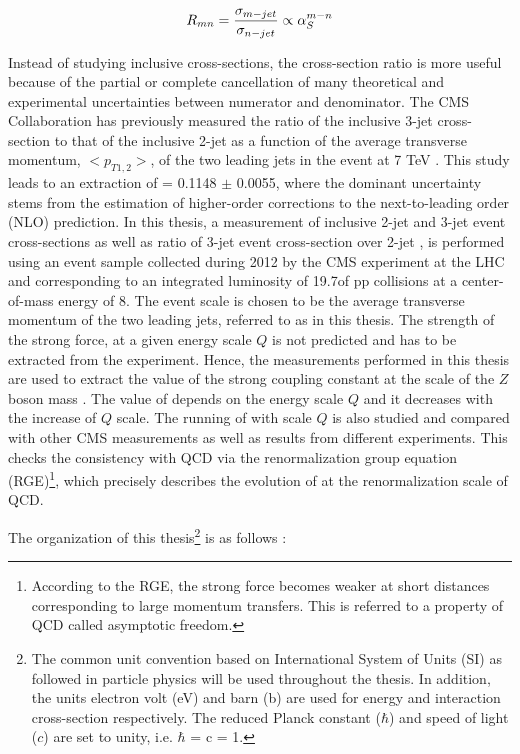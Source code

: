\begin{equation}
R_{mn} = \frac{\sigma_{m-jet}}{\sigma_{n-jet}} \propto \alps^{m-n}
\label{eq:ratio_mn}
\end{equation}

Instead of studying inclusive cross-sections, the cross-section ratio is more useful because of the partial or complete cancellation of many theoretical and experimental uncertainties between numerator and denominator. The CMS Collaboration has previously measured the ratio of the inclusive 3-jet cross-section to that of the inclusive 2-jet as a function of the average transverse momentum, $<p_{T1,2}>$, of the two leading jets in the event at 7 TeV \cite {Chatrchyan:2013txa}. This study leads to an extraction of \alpsmz = 0.1148 $\pm$ 0.0055, where the dominant uncertainty stems from the estimation of higher-order corrections to the next-to-leading order (NLO) prediction. In this thesis, a measurement of inclusive 2-jet and 3-jet event cross-sections as well as ratio of 3-jet event cross-section over 2-jet \rations, is performed using an event sample collected during 2012 by the CMS experiment at the LHC and corresponding to an integrated luminosity of 19.7\fbinv of pp collisions at a center-of-mass energy of 8\TeV. The event scale is chosen to be the average transverse momentum of the two leading jets, referred to as \httwo in this thesis. The strength of the strong force, \alps at a given energy scale $Q$ is not predicted and has to be extracted from the experiment. Hence, the measurements performed in this thesis are used to extract the value of the strong coupling constant at the scale of the $Z$ boson mass \alpsmz. The value of \alps depends on the energy scale $Q$ and it decreases with the increase of $Q$ scale. The running of \alps with scale $Q$ is also studied and compared with other CMS measurements as well as results from different experiments. This checks the consistency with QCD via the renormalization group equation (RGE)\footnote{According to the RGE, the strong force becomes weaker at short distances corresponding to large momentum transfers. This is referred to a property of QCD called asymptotic freedom.}, which precisely describes the evolution of \alps at the renormalization scale of QCD. 

The organization of this thesis\footnote{The common unit convention based on International System of Units (SI) as followed in particle physics will be used throughout the thesis. In addition, the units electron volt (eV) and barn (b) are used for energy and interaction cross-section respectively. The reduced Planck constant ($\hbar$) and speed of light ($c$) are set to unity, i.e. $\hbar$ = c = 1.} is as follows :

